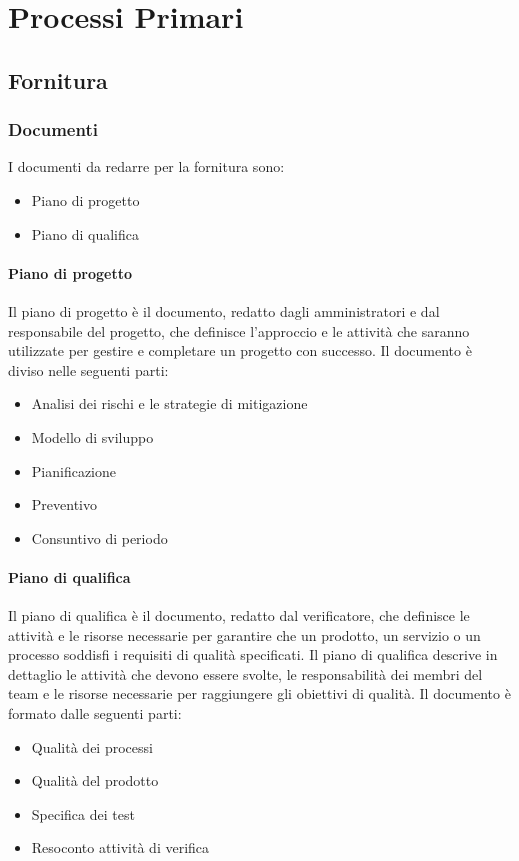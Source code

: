 \documentclass[12pt]{article}
\begin{document}
\section{Processi Primari}
\subsection{Fornitura}
\subsubsection{Documenti}
I documenti da redarre per la fornitura sono:
\begin{itemize}
    \item Piano di progetto
    \item Piano di qualifica
\end{itemize}
\paragraph{Piano di progetto}
Il piano di progetto è il documento, redatto dagli amministratori e dal responsabile del progetto, che definisce l'approccio e le attività che saranno utilizzate per gestire e completare un progetto con successo.
Il documento è diviso nelle seguenti parti:
\begin{itemize}
    \item Analisi dei rischi e le strategie di mitigazione
    \item Modello di sviluppo
    \item Pianificazione
    \item Preventivo
    \item Consuntivo di periodo
\end{itemize}
\paragraph{Piano di qualifica}
Il piano di qualifica è il documento, redatto dal verificatore, che definisce le attività e le risorse necessarie per garantire che un prodotto, un servizio o un processo soddisfi i requisiti di qualità specificati. Il piano di qualifica descrive in dettaglio le attività che devono essere svolte, le responsabilità dei membri del team e le risorse necessarie per raggiungere gli obiettivi di qualità.
Il documento è formato dalle seguenti parti:
\begin{itemize}
    \item  Qualità dei processi
    \item  Qualità del prodotto
    \item  Specifica dei test
    \item 	Resoconto attività di verifica
\end{itemize}
\end{document}
